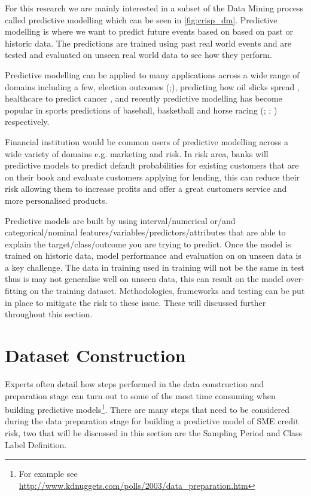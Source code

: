 For this research we are mainly interested in a subset of the Data Mining process called predictive modelling which can be seen in \ref{fig:crisp_dm}. Predictive modelling is where we want to predict future events based on based on past or historic data. The predictions are trained using past real world events and are tested and evaluated on unseen real world data to see how they perform. 

Predictive modelling can be applied to many applications across a wide range of domains including a few, election outcomes (\citep{silver_signal_2012};\cite{tumasjan_predicting_2010}), predicting how oil slicks spread \citep{liu_tracking_2011}, healthcare to predict cancer \citep{delen_predicting_2005}, and recently predictive modelling has become popular in sports predictions of baseball, basketball and horse racing (\cite{lewis_moneyball_2004}; \cite{stekler_predicting_2012}; \cite{silverman_predicting_2013}) respectively. 
 

Financial institution would be common users of predictive modelling across a wide variety of domains e.g. marketing and risk. In risk area, banks will predictive models to predict default probabilities for existing customers that are on their book and evaluate customers applying for lending, this can reduce their risk allowing them to increase profits and offer a great customers service and more personalised products.

Predictive models are built by using interval/numerical or/and categorical/nominal features/variables/predictors/attributes that are able to explain the target/class/outcome you are trying to predict. Once the model is trained on historic data, model performance and evaluation on on unseen data is a key challenge. The data in training used in training will not be the same in test thus is may not generalise well on unseen data, this can result on the model over-fitting on the training dataset. Methodologies, frameworks and testing can be put in place to mitigate the risk to these issue. These will discussed further throughout this section.

\section{Dataset Construction}

Experts often detail how steps performed in the data construction and preparation stage can turn out to some of the most time consuming  when building predictive models\footnote{For example see \url{http://www.kdnuggets.com/polls/2003/data_preparation.htm}}. There are many steps that need to be considered during the data preparation stage for building a predictive model of SME credit risk, two that will be discussed in this section are the Sampling Period and Class Label Definition. 

